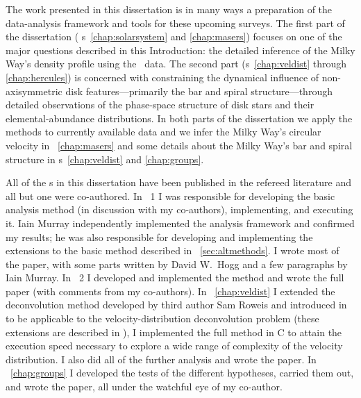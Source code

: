 The work presented in this dissertation is in many ways a preparation
of the data-analysis framework and tools for these upcoming
surveys. The first part of the dissertation (\chaptername
s~\ref{chap:solarsystem} and \ref{chap:masers}) focuses on one of the
major questions described in this Introduction: the detailed inference
of the Milky Way's density profile using the \Gaia\ data. The second
part (\chaptername s~\ref{chap:veldist} through \ref{chap:hercules})
is concerned with constraining the dynamical influence of
non-axisymmetric disk features---primarily the bar and spiral
structure---through detailed observations of the phase-space structure
of disk stars and their elemental-abundance distributions. In both
parts of the dissertation we apply the methods to currently available
data and we infer the Milky Way's circular velocity
in \chaptername~\ref{chap:masers} and some details about the Milky
Way's bar and spiral structure in \chaptername s~\ref{chap:veldist}
and \ref{chap:groups}.

All of the \chaptername s in this dissertation have been published in
the refereed literature and all but one were co-authored. In
\chaptername~1 I was responsible for developing the basic
analysis method (in discussion with my co-authors), implementing, and
executing it. Iain Murray independently implemented the analysis
framework and confirmed my results; he was also responsible for
developing and implementing the extensions to the basic method
described in \sectionname~\ref{sec:altmethods}. I wrote most of the
paper, with some parts written by David W.~Hogg and a few paragraphs
by Iain Murray. In \chaptername~2 I developed and implemented the
method and wrote the full paper (with comments from my
co-authors). In \chaptername~\ref{chap:veldist} I extended the
deconvolution method developed by third author Sam Roweis and
introduced in \citet{2005ApJ...629..268H} to be applicable to the
velocity-distribution deconvolution problem (these extensions are
described in \citealt{BovyXD}), I implemented the full method in C to
attain the execution speed necessary to explore a wide range of
complexity of the velocity distribution. I also did all of the further
analysis and wrote the paper. In \chaptername~\ref{chap:groups} I
developed the tests of the different hypotheses, carried them out, and
wrote the paper, all under the watchful eye of my co-author.
